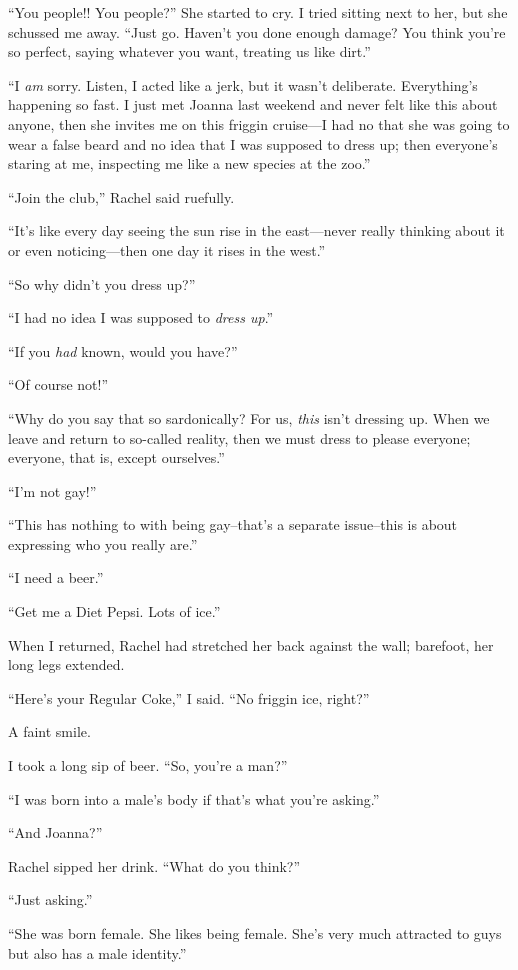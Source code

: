 ``You people!! You people?'' She started to cry. I tried sitting next to
her, but she schussed me away. ``Just go. Haven't you done enough
damage? You think you're so perfect, saying whatever you want, treating
us like dirt.''

``I \emph{am} sorry. Listen, I acted like a jerk, but it wasn't
deliberate. Everything's happening so fast. I just met Joanna last
weekend and never felt like this about anyone, then she invites me on
this friggin cruise---I had no that she was going to wear a false beard
and no idea that I was supposed to dress up; then everyone's staring at
me, inspecting me like a new species at the zoo.''

``Join the club,'' Rachel said ruefully.

``It's like every day seeing the sun rise in the east---never really
thinking about it or even noticing---then one day it rises in the
west.''

``So why didn't you dress up?''

``I had no idea I was supposed to \emph{dress up}.''

``If you \emph{had} known, would you have?''

``Of course not!''

``Why do you say that so sardonically? For us, \emph{this} isn't
dressing up. When we leave and return to so-called reality, then we must
dress to please everyone; everyone, that is, except ourselves.''

``I'm not gay!''

``This has nothing to with being gay--that's a separate issue--this is
about expressing who you really are.''

``I need a beer.''

``Get me a Diet Pepsi. Lots of ice.''

When I returned, Rachel had stretched her back against the wall;
barefoot, her long legs extended.

``Here's your Regular Coke,'' I said. ``No friggin ice, right?''

A faint smile.

I took a long sip of beer. ``So, you're a man?''

``I was born into a male's body if that's what you're asking.''

``And Joanna?''

Rachel sipped her drink. ``What do you think?''

``Just asking.''

``She was born female. She likes being female. She's very much attracted
to guys but also has a male identity.''


